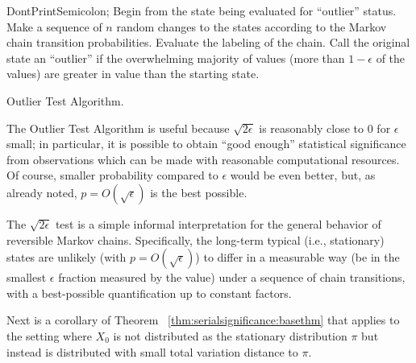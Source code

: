 \documentclass[12pt]{article}
\begin{document}
\begin{algorithm}[H]
    DontPrintSemicolon;   Begin from
    the state being evaluated for ``outlier'' status.\; Make a sequence
    of \( n \) random changes to the states according to the Markov
    chain transition probabilities.\; Evaluate the labeling of the
    chain.\; Call the original state an ``outlier'' if the overwhelming
    majority of values (more than \( 1 - \epsilon \) of the values) are
    greater in value than the starting state.\;
    \caption{Outlier Test Algorithm.}
\end{algorithm}

\begin{remark}
    The Outlier Test Algorithm is useful because \( \sqrt{2\epsilon} \)
    is reasonably close to \( 0 \) for \( \epsilon \) small; in
    particular, it is possible to obtain ``good enough'' statistical
    significance from observations which can be made with reasonable
    computational resources. Of course, smaller probability compared to \(
    \epsilon \) would be even better, but, as already noted, \( p = O(\sqrt
    {\epsilon}) \) is the best possible.
\end{remark}

\begin{remark}
    The \( \sqrt{2\epsilon} \) test is a simple informal interpretation
    for the general behavior of reversible Markov chains.  Specifically,
    the long-term typical (i.e., stationary) states are unlikely (with \(
    p = O(\sqrt{\epsilon}) \)) to differ in a measurable way (be in the
    smallest \( \epsilon \) fraction measured by the value) under a
    sequence of chain transitions, with a best-possible quantification
    up to constant factors.
\end{remark}

Next is a corollary of Theorem~%
\ref{thm:serialsignificance:basethm} that applies to the setting where \(
X_0 \) is not distributed as the stationary distribution \( \pi \) but
instead is distributed with small total variation distance to \( \pi \).
\end{document}
